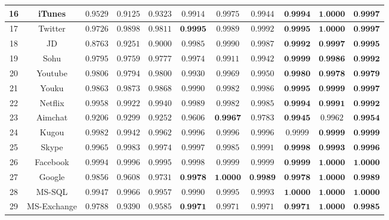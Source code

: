 \documentclass[degree=master,cjk-font=noto]{thuthesis}
\begin{document}
\begin{table}[!htp]
\begin{center}
\begin{center}
\begin{tabular}{c|c|c c c|c c c|c c c}
			16 & iTunes & $0.9529$ & $0.9125$ & $0.9323$ & $0.9914$ & $0.9975$ & $0.9944$ & $\textbf{0.9994}$ & $\textbf{1.0000}$ & $\textbf{0.9997}$ \\\hline
			17 & Twitter & $0.9726$ & $0.9898$ & $0.9811$ & $\textbf{0.9995}$ & $0.9989$ & $0.9992$ & $\textbf{0.9995}$ & $\textbf{1.0000}$ & $\textbf{0.9997}$ \\\hline
			18 & JD & $0.8763$ & $0.9251$ & $0.9000$ & $0.9985$ & $0.9990$ & $0.9987$ & $\textbf{0.9992}$ & $\textbf{0.9997}$ & $\textbf{0.9995}$ \\\hline
			19 & Sohu & $0.9795$ & $0.9759$ & $0.9777$ & $0.9974$ & $0.9911$ & $0.9942$ & $\textbf{0.9999}$ & $\textbf{0.9986}$ & $\textbf{0.9992}$ \\\hline
			20 & Youtube & $0.9806$ & $0.9794$ & $0.9800$ & $0.9930$ & $0.9969$ & $0.9950$ & $\textbf{0.9980}$ & $\textbf{0.9978}$ & $\textbf{0.9979}$ \\\hline
			21 & Youku & $0.9863$ & $0.9873$ & $0.9868$ & $0.9990$ & $0.9982$ & $0.9986$ & $\textbf{0.9995}$ & $\textbf{0.9999}$ & $\textbf{0.9997}$ \\\hline
			22 & Netflix & $0.9958$ & $0.9922$ & $0.9940$ & $0.9989$ & $0.9982$ & $0.9985$ & $\textbf{0.9994}$ & $\textbf{0.9991}$ & $\textbf{0.9992}$ \\\hline
			23 & Aimchat & $0.9206$ & $0.9299$ & $0.9252$ & $0.9606$ & $\textbf{0.9967}$ & $0.9783$ & $\textbf{0.9945}$ & $0.9962$ & $\textbf{0.9954}$ \\\hline
			24 & Kugou & $0.9982$ & $0.9942$ & $0.9962$ & $0.9996$ & $0.9996$ & $0.9996$ & $0.9999$ & $\textbf{0.9999}$ & $\textbf{0.9999}$ \\\hline
			25 & Skype & $0.9965$ & $0.9983$ & $0.9974$ & $0.9997$ & $0.9985$ & $0.9991$ & $\textbf{0.9998}$ & $\textbf{0.9993}$ & $\textbf{0.9996}$ \\\hline
			26 & Facebook & $0.9994$ & $0.9996$ & $0.9995$ & $0.9998$ & $0.9999$ & $0.9999$ & $\textbf{0.9999}$ & $\textbf{1.0000}$ & $\textbf{1.0000}$ \\\hline
			27 & Google & $0.9856$ & $0.9608$ & $0.9731$ & $\textbf{0.9978}$ & $\textbf{1.0000}$ & $\textbf{0.9989}$ & $\textbf{0.9978}$ & $\textbf{1.0000}$ & $\textbf{0.9989}$ \\\hline
			28 & MS-SQL & $0.9947$ & $0.9966$ & $0.9957$ & $0.9990$ & $0.9995$ & $0.9993$ & $\textbf{1.0000}$ & $\textbf{1.0000}$ & $\textbf{1.0000}$ \\\hline
			29 & MS-Exchange & $0.9788$ & $0.9390$ & $0.9585$ & $\textbf{0.9971}$ & $0.9971$ & $0.9971$ & $\textbf{0.9971}$ & $\textbf{1.0000}$ & $\textbf{0.9985}$ \\

\end{tabular}
\end{center}
\end{center}
\end{table}
\end{document}
